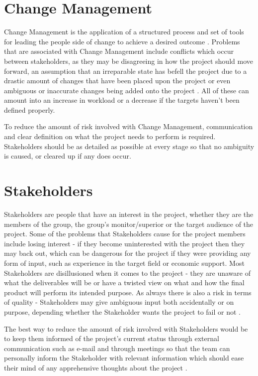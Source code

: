 \section{Change Management}
Change Management is the application of a structured process and set of tools
for leading the people side of change to achieve a desired outcome
\cite{changeManDef}.  Problems that are associated with Change Management
include conflicts which occur between stakeholders, as they may be
disagreeing in how the project should move forward, an assumption that an
irreparable state has befell the project due to a drastic amount of changes that
have been placed upon the project or even ambiguous or inaccurate changes being
added onto the project \cite{RiskList}.  All of these can amount into an
increase in workload or a decrease if the targets haven't been defined properly.

To reduce the amount of risk involved with Change Management, communication and
clear definition on what the project needs to perform is required.  Stakeholders
should be as detailed as possible at every stage so that no ambiguity is caused,
or cleared up if any does occur.

\section{Stakeholders}
Stakeholders are people that have an interest in the project, whether they are
the members of the group, the group's monitor/superior or the target audience of
the project.  Some of the problems that Stakeholders cause for the project
members include losing interest - if they become uninterested with the project
then they may back out, which can be dangerous for the project if they were
providing any form of input, such as experience in the target field or economic
support.  Most Stakeholders are disillusioned when it comes to the project - 
they are unaware of what the deliverables will be or have a twisted view on what
and how the final product will perform its intended purpose.  As always there is
also a risk in terms of quality - Stakeholders may give ambiguous input both
accidentally or on purpose, depending whether the Stakeholder wants the project
to fail or not \cite{RiskList}.

The best way to reduce the amount of risk involved with Stakeholders would be to
keep them informed of the project's current status through external
communication such as e-mail and through meetings so that the team can
personally inform the Stakeholder with relevant information which should ease
their mind of any apprehensive thoughts about the project \cite{stakeInfo}.

